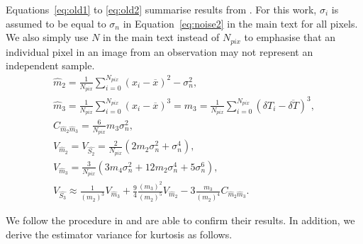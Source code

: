 \documentclass[fleqn,usenatbib]{mnras}
\begin{document}
Equations~\ref{eq:old1} to \ref{eq:old2} summarise results from \citet{Watkinson:2014jv}. For this work, $\sigma_i$ is assumed to be equal to $\sigma_n$ in Equation~\ref{eq:noise2} in the main text for all pixels. We also simply use $N$ in the main text instead of $N_{pix}$ to emphasise that an individual pixel in an image from an observation may not represent an independent sample.
\begin{gather}
    \label{eq:old1}
    \hat{m}_2 = \frac{1}{N_{pix}} \sum_{i=0}^{N_{pix}}
        (x_i - \overline{x})^2 
        - \sigma_n^2, \\
    \hat{m}_3 = \frac{1}{N_{pix}} \sum_{i=0}^{N_{pix}}
        (x_i - \overline{x})^3 = m_3 = \frac{1}{N_{pix}} \sum_{i=0}^{N_{pix}}
        (\delta T_i - \overline{\delta T})^3, \\
    C_{\hat{m}_2\hat{m}_3} = \frac{6}{N_{pix}}m_3\sigma_n^2, \\
    V_{\hat{m}_2} = V_{\hat{S_2}} = \frac{2}{N_{pix}}
        (2 m_2 \sigma_n^2 + \sigma_n^4), \\
    V_{\hat{m}_3} = \frac{3}{N_{pix}}
        (3 m_4 \sigma_n^2 + 12 m_2 \sigma_n^4 
        + 5 \sigma_n^6), \\
    V_{\hat{S_3}} \approx \frac{1}{(m_2)^3}V_{\hat{m}_3}
        + \frac{9}{4}\frac{(m_3)^2}{(m_2)^5}V_{\hat{m}_2}
        - 3\frac{m_3}{(m_2)^4}C_{\hat{m}_2\hat{m}_3}. 
    \label{eq:old2}
\end{gather}

We follow the procedure in \citet{Watkinson:2014jv} and are able to confirm their results. In addition, we derive the estimator variance for kurtosis as follows. 
\end{document}
